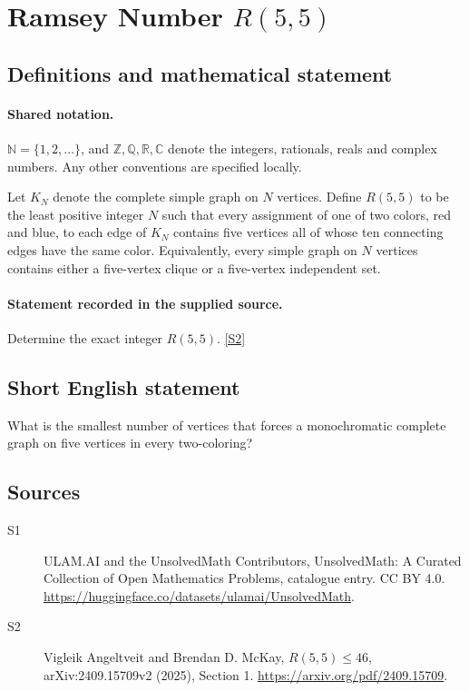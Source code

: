 \documentclass[11pt]{article}
\newcommand{\sref}[2]{\hyperlink{source:#1:#2}{[S#2]}}
\begin{document}
\section{Ramsey Number $R(5,5)$}\label{statement}

\subsection{Definitions and mathematical statement}

\paragraph{Shared notation.}$\mathbb N=\{1,2,\ldots\}$, and $\mathbb Z,\mathbb Q,\mathbb R,\mathbb C$ denote the integers, rationals, reals and complex numbers. Any other conventions are specified locally.


Let $K_N$ denote the complete simple graph on $N$ vertices. Define $R(5,5)$ to be the least positive integer $N$ such that every assignment of one of two colors, red and blue, to each edge of $K_N$ contains five vertices all of whose ten connecting edges have the same color. Equivalently, every simple graph on $N$ vertices contains either a five-vertex clique or a five-vertex independent set.
\paragraph{Statement recorded in the supplied source.}
Determine the exact integer $R(5,5)$. \sref{statement}{2}

\subsection{Short English statement}
What is the smallest number of vertices that forces a monochromatic complete graph on five vertices in every two-coloring?
\subsection{Sources}
\begin{description}
\item[\hypertarget{source:statement:1}{S1}] ULAM.AI and the UnsolvedMath Contributors, UnsolvedMath: A Curated Collection of Open Mathematics Problems, catalogue entry. CC BY 4.0. \url{https://huggingface.co/datasets/ulamai/UnsolvedMath}.
\item[\hypertarget{source:statement:2}{S2}] Vigleik Angeltveit and Brendan D. McKay, \emph{$R(5,5)\leq46$}, arXiv:2409.15709v2 (2025), Section 1. \url{https://arxiv.org/pdf/2409.15709}.
\end{description}
\label{end:statement}
\end{document}
